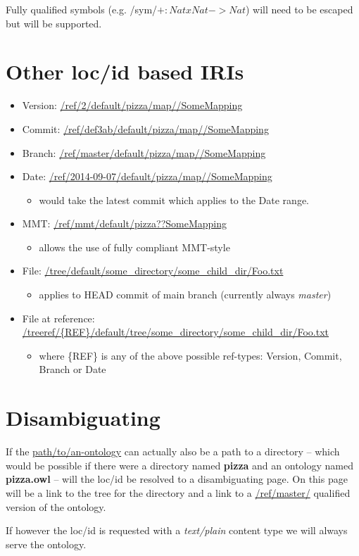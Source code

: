 \documentclass[a4paper,11pt,DIV=25]{scrartcl}
\begin{document}
Fully qualified symbols (e.g. /sym/$+:NatxNat->Nat$) will need to be escaped
but will be supported.

\section{Other loc/id based IRIs}

\begin{itemize}
  \item Version: \url{/ref/2/default/pizza/map//SomeMapping}
  \item Commit: \url{/ref/def3ab/default/pizza/map//SomeMapping}
  \item Branch: \url{/ref/master/default/pizza/map//SomeMapping}
  \item Date: \url{/ref/2014-09-07/default/pizza/map//SomeMapping}
    \begin{itemize}
      \item would take the latest commit which applies to the Date range.
    \end{itemize}
  \item MMT: \url{/ref/mmt/default/pizza??SomeMapping}
    \begin{itemize}
      \item allows the use of fully compliant MMT-style
    \end{itemize}
  \item File: \url{/tree/default/some_directory/some_child_dir/Foo.txt}
    \begin{itemize}
      \item applies to HEAD commit of main branch (currently always \textit{master})
    \end{itemize}
  \item File at reference: \url{/treeref/{REF}/default/tree/some_directory/some_child_dir/Foo.txt}
    \begin{itemize}
      \item where \{REF\} is any of the above possible ref-types: Version, Commit, Branch or Date
    \end{itemize}
\end{itemize}

\section{Disambiguating}

If the \url{path/to/an-ontology} can actually also be a path to a directory  --
which would be possible if there were a directory named \textbf{pizza} and an
ontology named \textbf{pizza.owl} -- will the loc/id be resolved to a
disambiguating page. On this page will be a link to the tree for the directory
and a link to a \url{/ref/master/} qualified version of the ontology.

If however the loc/id is requested with a \textit{text/plain} content type we
will always serve the ontology.
\end{document}

